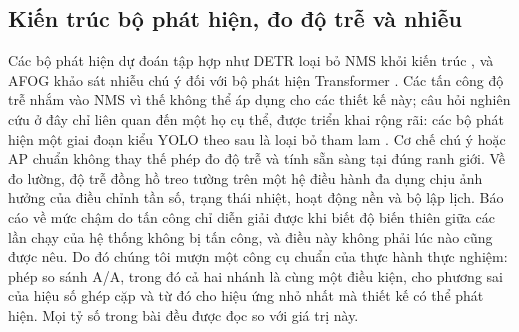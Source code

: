 \documentclass[12pt,a4paper]{article}
\begin{document}
\subsection{Kiến trúc bộ phát hiện, đo độ trễ và nhiễu}
Các bộ phát hiện dự đoán tập hợp như DETR loại bỏ NMS khỏi kiến trúc \cite{carion2020detr}, và AFOG khảo sát nhiễu chú ý đối với bộ phát hiện Transformer \cite{afog2025}. Các tấn công độ trễ nhắm vào NMS vì thế không thể áp dụng cho các thiết kế này; câu hỏi nghiên cứu ở đây chỉ liên quan đến một họ cụ thể, được triển khai rộng rãi: các bộ phát hiện một giai đoạn kiểu YOLO theo sau là loại bỏ tham lam \cite{redmon2016yolo,neubeck2006nms,yolov12,yolov13}. Cơ chế chú ý hoặc AP chuẩn không thay thế phép đo độ trễ và tính sẵn sàng tại đúng ranh giới. Về đo lường, độ trễ đồng hồ treo tường trên một hệ điều hành đa dụng chịu ảnh hưởng của điều chỉnh tần số, trạng thái nhiệt, hoạt động nền và bộ lập lịch. Báo cáo về mức chậm do tấn công chỉ diễn giải được khi biết độ biến thiên giữa các lần chạy của hệ thống không bị tấn công, và điều này không phải lúc nào cũng được nêu. Do đó chúng tôi mượn một công cụ chuẩn của thực hành thực nghiệm: phép so sánh A/A, trong đó cả hai nhánh là cùng một điều kiện, cho phương sai của hiệu số ghép cặp và từ đó cho hiệu ứng nhỏ nhất mà thiết kế có thể phát hiện. Mọi tỷ số trong bài đều được đọc so với giá trị này.
\end{document}
